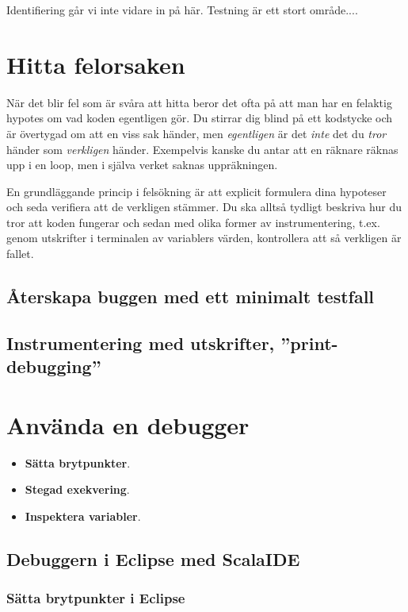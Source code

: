 Identifiering går vi inte vidare in på här. Testning är ett stort område....



\section{Hitta felorsaken}

När det blir fel som är svåra att hitta beror det ofta på att man har en felaktig hypotes om vad koden egentligen gör. Du stirrar dig blind på ett kodstycke och är övertygad om att en viss sak händer, men \emph{egentligen} är det \emph{inte} det du \emph{tror} händer som \emph{verkligen} händer. Exempelvis kanske du antar att en räknare räknas upp i en loop, men i själva verket saknas uppräkningen. 

En grundläggande princip i felsökning är att explicit formulera dina hypoteser och seda verifiera att de verkligen stämmer. Du ska alltså tydligt beskriva hur du tror att koden fungerar och sedan med olika former av instrumentering, t.ex. genom utskrifter i terminalen av variablers värden, kontrollera att så verkligen är fallet.

\subsection{Återskapa buggen med ett minimalt testfall}

\subsection{Instrumentering med utskrifter, ''print-debugging''}

\section{Använda en debugger}

\begin{itemize}
\item \textbf{Sätta brytpunkter}.
\item \textbf{Stegad exekvering}.
\item \textbf{Inspektera variabler}.
\end{itemize}

\subsection{Debuggern i Eclipse med ScalaIDE}
\subsubsection{Sätta brytpunkter i Eclipse}
